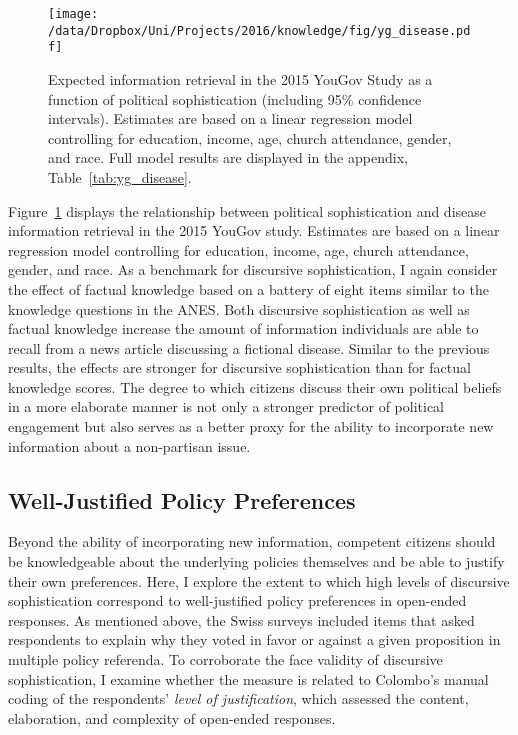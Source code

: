 \begin{figure}[h]\centering
\texttt{[image: /data/Dropbox/Uni/Projects/2016/knowledge/fig/yg\_disease.pdf]}
\caption[Expected information retrieval in the 2015 YouGov Study as a function of political sophistication]{Expected information retrieval in the 2015 YouGov Study as a function of political sophistication (including 95\% confidence intervals). Estimates are based on a linear regression model controlling for education, income, age, church attendance, gender, and race. Full model results are displayed in the appendix, Table~\ref{tab:yg_disease}.}\label{fig:yg_disease}
\end{figure}

Figure~\ref{fig:yg_disease} displays the relationship between political sophistication and disease information retrieval in the 2015 YouGov study. Estimates are based on a linear regression model controlling for education, income, age, church attendance, gender, and race. As a benchmark for discursive sophistication, I again consider the effect of factual knowledge based on a battery of eight items similar to the knowledge questions in the ANES. Both discursive sophistication as well as factual knowledge increase the amount of information individuals are able to recall from a news article discussing a fictional disease. Similar to the previous results, the effects are stronger for discursive sophistication than for factual knowledge scores. The degree to which citizens discuss their own political beliefs in a more elaborate manner is not only a stronger predictor of political engagement but also serves as a better proxy for the ability to incorporate new information about a non-partisan issue.


\subsection*{Well-Justified Policy Preferences}
Beyond the ability of incorporating new information, competent citizens should be knowledgeable about the underlying policies themselves and be able to justify their own preferences. Here, I explore the extent to which high levels of discursive sophistication correspond to well-justified policy preferences in open-ended responses. As mentioned above, the Swiss surveys included items that asked respondents to explain why they voted in favor or against a given proposition in multiple policy referenda. To corroborate the face validity of discursive sophistication, I examine whether the measure is related to Colombo's \citeyearpar{colombo2016justifications} manual coding of the respondents' \textit{level of justification}, which assessed the content, elaboration, and complexity of open-ended responses.

